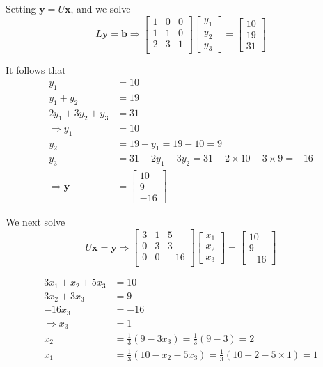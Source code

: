 \documentclass[11pt]{article}
\renewcommand{\vec}[1]{\mathbf{#1}}
\begin{document}
Setting $\vec{y} = U \vec{x}$, and we solve 
\[ L \vec{y} = \vec{b} \Rightarrow \begin{bmatrix}
1 & 0 & 0 \\
1 & 1 & 0 \\
2 & 3 & 1 \\
\end{bmatrix}
\begin{bmatrix}
y_1 \\
y_2 \\
y_3
\end{bmatrix}
= \begin{bmatrix}
10 \\
19 \\
31
\end{bmatrix}
\]

It follows that
\begin{align*}
y_1 &= 10 \\
y_1 + y_2 &= 19 \\
2y_1  + 3y_2 + y_3 &= 31 \\
\Rightarrow y_1 &= 10 \\
y_2 &= 19 - y_1 = 19 - 10 = 9 \\
y_3 &= 31 - 2y_1 - 3y_2 = 31 - 2 \times 10 - 3 \times 9 = -16 \\
\Rightarrow \vec{y} &= \begin{bmatrix}
10 \\
9\\
-16
\end{bmatrix}
\end{align*}

We next solve
\[ U \vec{x} = \vec{y} \Rightarrow 
\begin{bmatrix}
3 & 1 & 5 \\
0 & 3 & 3 \\
0 & 0 & -16 \\
\end{bmatrix}
\begin{bmatrix}
x_1\\
x_2\\
x_3
\end{bmatrix}
= \begin{bmatrix}
10 \\
9\\
-16
\end{bmatrix}
\]

\begin{align*}
3x_1 + x_2 + 5x_3 &= 10\\
3x_2 + 3x_3 &= 9\\
-16x_3 &= -16\\
\Rightarrow x_3 &= 1\\
x_2 &= \frac{1}{3}(9 - 3x_3) = \frac{1}{3}(9 - 3) = 2\\
x_1 &= \frac{1}{3}(10 - x_2 - 5x_3) = \frac{1}{3}(10 - 2 - 5 \times 1) = 1
\end{align*}
\end{document}
